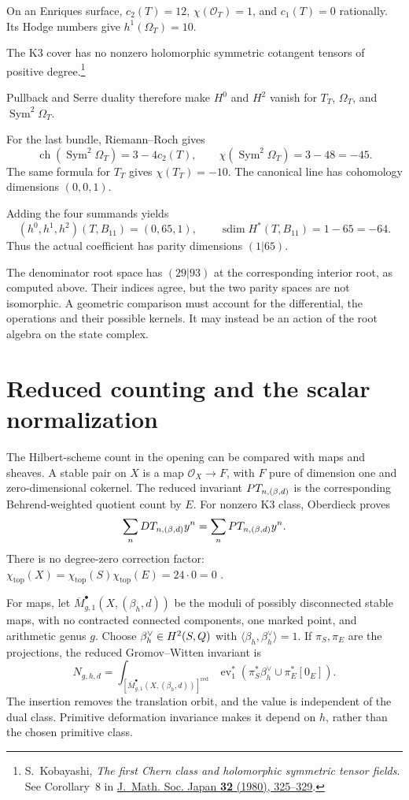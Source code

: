 On an Enriques surface, $c_2(T)=12$,
$\chi(\mathcal O_T)=1$, and $c_1(T)=0$ rationally.
Its Hodge numbers give $h^1(\Omega_T)=10$.

The K3 cover has no nonzero holomorphic symmetric cotangent
tensors of positive degree.\footnote{S.~Kobayashi,
\emph{The first Chern class and holomorphic symmetric tensor fields}.
See Corollary~8 in
\href{https://www.jstage.jst.go.jp/article/jmath1948/32/2/32_2_325/_pdf}
{J.~Math. Soc. Japan \textbf{32} (1980), 325--329}.}

Pullback and Serre duality therefore make $H^0$ and $H^2$
vanish for $T_T$, $\Omega_T$, and $\operatorname{Sym}^2\Omega_T$.

For the last bundle, Riemann--Roch gives
\[
 \operatorname{ch}(\operatorname{Sym}^2\Omega_T)=3-4c_2(T),
 \qquad
 \chi(\operatorname{Sym}^2\Omega_T)=3-48=-45.
\]
The same formula for $T_T$ gives $\chi(T_T)=-10$.
The canonical line has cohomology dimensions $(0,0,1)$.

Adding the four summands yields
\[
 (h^0,h^1,h^2)(T,B_{11})=(0,65,1),
 \qquad \operatorname{sdim}H^*(T,B_{11})=1-65=-64.
\]
Thus the actual coefficient has parity dimensions $(1|65)$.

The denominator root space has $(29|93)$ at the corresponding
interior root, as computed above. Their indices agree, but the
two parity spaces are not isomorphic.
A geometric comparison must account for the differential,
the operations and their possible kernels.
It may instead be an action of the root algebra on the state complex.

\section{Reduced counting and the scalar normalization}
\label{sec:level-n-scalar-shadow}

The Hilbert-scheme count in the opening can be compared with maps
and sheaves. A stable pair on \(X\) is a map
\(\mathcal O_X\to F\), with \(F\) pure of dimension one and
zero-dimensional cokernel. The reduced invariant \(PT_{n,(\beta,d)}\)
is the corresponding Behrend-weighted quotient count by \(E\).
For nonzero K3 class, Oberdieck proves
\[
 \sum_nDT_{n,(\beta,d)}y^n
 =\sum_nPT_{n,(\beta,d)}y^n.
\]
There is no degree-zero correction factor: \(\chi_{\mathrm{top}}(X)
=\chi_{\mathrm{top}}(S)\chi_{\mathrm{top}}(E)=24\cdot0=0\)
\cite[\S0.3, Theorem 3(i)]{OberdieckReducedPT}.

For maps, let \(\overline M^{\bullet}_{g,1}(X,(\beta_h,d))\)
be the moduli of possibly disconnected stable maps, with no
contracted connected components, one marked point, and arithmetic
genus \(g\). Choose \(\beta_h^\vee\in H^2(S,Q)\) with
\(\langle\beta_h,\beta_h^\vee\rangle=1\). If \(\pi_S,\pi_E\)
are the projections, the reduced Gromov--Witten invariant is
\[
 N_{g,h,d}=\int_{[\overline M^{\bullet}_{g,1}(X,(\beta_h,d))]^{\mathrm{red}}}
 \operatorname{ev}_1^*(\pi_S^*\beta_h^\vee\cup\pi_E^*[0_E]).
\]
The insertion removes the translation orbit, and the value is
independent of the dual class. Primitive deformation invariance
makes it depend on \(h\), rather than the chosen primitive class.

